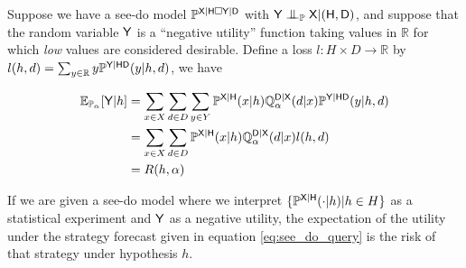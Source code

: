 Suppose we have a see-do model $\mathbb{P}^{\mathsf{X}|\mathsf{H}\square \mathsf{Y}|\mathsf{D}}$ with $\RV{Y}\CI_{\model{P}} \RV{X}|(\RV{H,D})$, and suppose that the random variable $\mathsf{Y}$ is a ``negative utility'' function taking values in $\mathbb{R}$ for which \emph{low} values are considered desirable. Define a loss $l:H\times D\to \mathbb{R}$ by $l(h,d) = \sum_{y\in \mathbb{R}} y\mathbb{P}^{\mathsf{Y}|\mathsf{H}\mathsf{D}}(y|h,d)$, we have 

\begin{align}
    \mathbb{E}_{\mathbb{P}_{\alpha}}[\mathsf{Y}|h] &= \sum_{x\in X} \sum_{d\in D} \sum_{y\in Y} \mathbb{P}^{\mathsf{X}|\mathsf{H}}(x|h) \mathbb{Q}_\alpha^{\mathsf{D}|\mathsf{X}}(d|x) \mathbb{P}^{\mathsf{Y}|\mathsf{HD}}(y|h,d)\\
    &= \sum_{x\in X} \sum_{d\in D} \mathbb{P}^{\mathsf{X}|\mathsf{H}}(x|h) \mathbb{Q}_\alpha^{\mathsf{D}|\mathsf{X}}(d|x) l(h,d)\\
    &= R(h,\alpha)
\end{align}

If we are given a see-do model where we interpret $\{\mathbb{P}^{\mathsf{X}|\mathsf{H}}(\cdot|h)|h\in H\}$ as a statistical experiment and $\mathsf{Y}$ as a negative utility, the expectation of the utility under the strategy forecast given in equation \ref{eq:see_do_query} is the risk of that strategy under hypothesis $h$.

